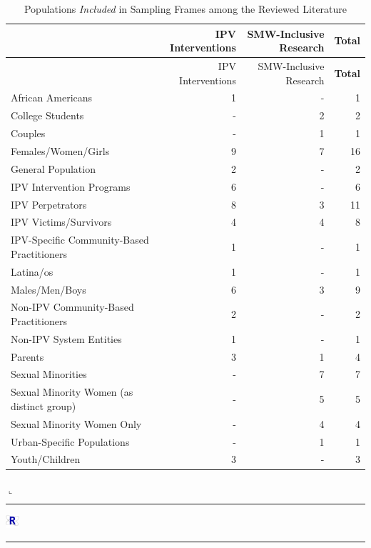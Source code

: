 \documentclass[11pt,]{tufte-book}
\newenvironment{Shaded}{}{}
\newcommand{\KeywordTok}[1]{\textcolor[rgb]{0.00,0.44,0.13}{\textbf{#1}}}
\newcommand{\DataTypeTok}[1]{\textcolor[rgb]{0.56,0.13,0.00}{#1}}
\newcommand{\StringTok}[1]{\textcolor[rgb]{0.25,0.44,0.63}{#1}}
\newcommand{\OperatorTok}[1]{\textcolor[rgb]{0.40,0.40,0.40}{#1}}
\newcommand{\NormalTok}[1]{#1}
\newcommand{\Rrule}{
    \vspace*{1em}
    \noindent
    \hspace{-1em}
    \includegraphics[width=0.5cm]{auxDocs/Rlogo.png}
    \textcolor{Rblue}{
        \rule[0.1in]{0.90\linewidth}{0.02mm}
    }
    \vspace{-1.35em}
}
\newcommand{\Rerule}{
    \noindent
    \hspace{-1em}
    \textcolor{Rblue}{
        $\llcorner$\rule[-0.4mm]{\linewidth}{0.02mm}
    }
}
\begin{document}
\begin{Shaded}
\end{Shaded}

\begin{longtable}[]{@{}lrrr@{}}
\caption{Populations \emph{Included} in Sampling Frames among the
Reviewed Literature \label{tbl:ftmpopp}}\tabularnewline
\toprule
& IPV Interventions & SMW-Inclusive Research &
\textbf{Total}\tabularnewline
\midrule
\endfirsthead
\toprule
& IPV Interventions & SMW-Inclusive Research &
\textbf{Total}\tabularnewline
\midrule
\endhead
African Americans & 1 & - & 1\tabularnewline
College Students & - & 2 & 2\tabularnewline
Couples & - & 1 & 1\tabularnewline
Females/Women/Girls & 9 & 7 & 16\tabularnewline
General Population & 2 & - & 2\tabularnewline
IPV Intervention Programs & 6 & - & 6\tabularnewline
IPV Perpetrators & 8 & 3 & 11\tabularnewline
IPV Victims/Survivors & 4 & 4 & 8\tabularnewline
IPV-Specific Community-Based Practitioners & 1 & - & 1\tabularnewline
Latina/os & 1 & - & 1\tabularnewline
Males/Men/Boys & 6 & 3 & 9\tabularnewline
Non-IPV Community-Based Practitioners & 2 & - & 2\tabularnewline
Non-IPV System Entities & 1 & - & 1\tabularnewline
Parents & 3 & 1 & 4\tabularnewline
Sexual Minorities & - & 7 & 7\tabularnewline
Sexual Minority Women (as distinct group) & - & 5 & 5\tabularnewline
Sexual Minority Women Only & - & 4 & 4\tabularnewline
Urban-Specific Populations & - & 1 & 1\tabularnewline
Youth/Children & 3 & - & 3\tabularnewline
\bottomrule
\end{longtable}

\Rerule

\newpage

\Rrule

\begin{Shaded}
\end{Shaded}
\end{document}
